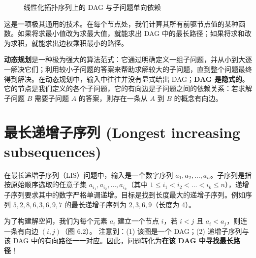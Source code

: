 \begin{figure}[htbp]
\centering
{}
\caption{线性化拓扑序列上的 DAG 与子问题单向依赖}
\label{fig:dag_dp_linear}
\end{figure}

这是一项极其通用的技术。在每个节点处，我们计算其所有前驱节点值的某种函数。如果将求最小值改为求最大值，就能求出 DAG 中的最长路径；如果将求和改为求积，就能求出边权乘积最小的路径。

\textbf{动态规划}是一种极为强大的算法范式：它通过明确定义一组子问题，并从小到大逐一解决它们；利用较小子问题的答案来帮助求解较大的子问题，直到整个问题最终得到解决。在动态规划中，输入中往往并没有显式给出 DAG；\textbf{DAG 是隐式的}。它的节点是我们定义的各个子问题，它的有向边是子问题之间的依赖关系：若求解子问题 $B$ 需要子问题 $A$ 的答案，则存在一条从 $A$ 到 $B$ 的概念有向边。

\section{最长递增子序列 (Longest increasing subsequences)}

在最长递增子序列（LIS）问题中，输入是一个数字序列 $a_1, a_2, \dots, a_n$。子序列是指按原始顺序选取的任意子集 $a_{i_1}, a_{i_2}, \dots, a_{i_k}$（其中 $1 \le i_1 < i_2 < \dots < i_k \le n$），递增子序列要求其中的数字严格单调递增。目标是找到长度最大的递增子序列。例如序列 $5, 2, 8, 6, 3, 6, 9, 7$ 的最长递增子序列为 $2, 3, 6, 9$（长度为 4）。

为了构建解空间，我们为每个元素 $a_i$ 建立一个节点 $i$，若 $i < j$ 且 $a_i < a_j$，则连一条有向边 $(i, j)$（图 6.2）。
注意到：(1) 该图是一个 DAG；(2) 递增子序列与该 DAG 中的有向路径一一对应。因此，问题转化为\textbf{在该 DAG 中寻找最长路径}！


